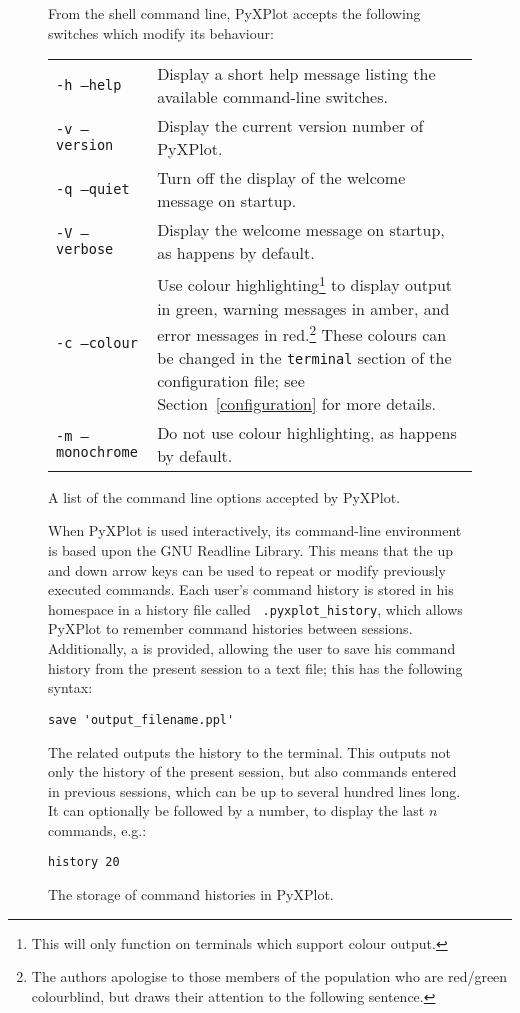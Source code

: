 \begin{figure}
From the shell command line, PyXPlot accepts the following switches which
modify its behaviour:
\vspace{0.5cm}

\begin{tabular}{p{3.5cm}p{8.5cm}}
{\tt -h --help} & Display a short help message listing the available command-line switches.\\
{\tt -v --version} & Display the current version number of PyXPlot.\\
{\tt -q --quiet} & Turn off the display of the welcome message on startup. \\
{\tt -V --verbose} & Display the welcome message on startup, as happens by default. \\
{\tt -c --colour} & Use colour highlighting\footnote{This will only function on terminals which support colour output.} to display output in green, warning messages in amber, and error messages in red.\footnote{The authors apologise to those members of the population who are red/green colourblind, but draws their attention to the following sentence.} These colours can be changed in the {\tt terminal} section of the configuration file; see Section~\ref{configuration} for more details. \\
{\tt -m --monochrome} & Do not use colour highlighting, as happens by default. \\
\end{tabular}
\caption{A list of the command line options accepted by PyXPlot.}
\label{command_switches}
\end{figure}

\begin{figure}
When PyXPlot is used interactively, its command-line environment is based upon
the GNU Readline Library.  This means that the up and down arrow keys can be
used to repeat or modify previously executed commands. Each user's command
history is stored in his homespace in a history file called {\tt
.pyxplot\_history}, which allows PyXPlot to remember command histories between
sessions. Additionally, a  is provided, allowing the user to save
his command history from the present session to a text file; this has the
following syntax:

\begin{verbatim}
save 'output_filename.ppl'
\end{verbatim}

The related  outputs the history to the terminal. This outputs
not only the history of the present session, but also commands entered in
previous sessions, which can be up to several hundred lines long. It can
optionally be followed by a number, to display the last $n$ commands, e.g.:

\begin{verbatim}
history 20
\end{verbatim}
\caption{The storage of command histories in PyXPlot.}
\label{command_history}
\end{figure}

